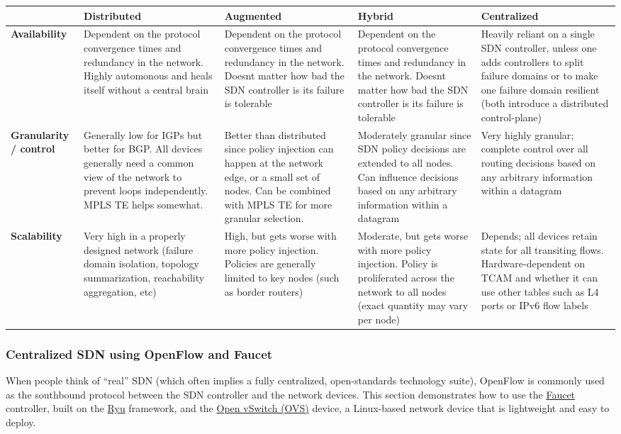 \begin{longtable}{LLLLL}
\toprule
&
\textbf{Distributed}
&
\textbf{Augmented}
&
\textbf{Hybrid}
&
\textbf{Centralized}
\\ \midrule
\textbf{Availability}
&
Dependent on the protocol convergence times and redundancy in the network.
Highly automonous and heals itself without a central brain
&
Dependent on the protocol convergence times and redundancy in the network.
Doesnt matter how bad the SDN controller is its failure is tolerable
&
Dependent on the protocol convergence times and redundancy in the network.
Doesnt matter how bad the SDN controller is  its failure is tolerable
&
Heavily reliant on a single SDN controller, unless one adds controllers to
split failure domains or to make one failure domain resilient
(both introduce a distributed control-plane)
\\ \midrule
\textbf{Granularity / control}
&
Generally low for IGPs but better for BGP\@. All devices generally need a common
view of the network to prevent loops independently. MPLS TE helps somewhat.
&
Better than distributed since policy injection can happen at the network edge,
or a small set of nodes. Can be combined with MPLS TE for more granular selection.
&
Moderately granular since SDN policy decisions are extended to all nodes. Can
influence decisions based on any arbitrary information within a datagram
&
Very highly granular; complete control over all routing decisions based on any
arbitrary information within a datagram
\\ \midrule
\textbf{Scalability}
&
Very high in a properly designed network (failure domain isolation, topology
summarization, reachability aggregation, etc)
&
High, but gets worse with more policy injection. Policies are generally
limited to key nodes (such as border routers)
&
Moderate, but gets worse with more policy injection. Policy is proliferated
across the network to all nodes (exact quantity may vary per node)
&
Depends; all devices retain state for all transiting flows. Hardware-dependent
on TCAM and whether it can use other tables such as L4 ports or IPv6 flow
labels
\\
\bottomrule
\end{longtable}

\subsubsection{Centralized SDN using OpenFlow and Faucet}
When people think of ``real'' SDN (which often implies a fully centralized,
open-standards technology suite), OpenFlow is commonly used as the
southbound protocol between the SDN controller and the network devices.
This section demonstrates how to use the \href{https://faucet.nz/}{Faucet}
controller, built on the \href{https://osrg.github.io/ryu-book/en/html/}{Ryu}
framework, and the \href{https://www.openvswitch.org/}{Open vSwitch (OVS)}
device, a Linux-based network device that is lightweight and easy to deploy.

